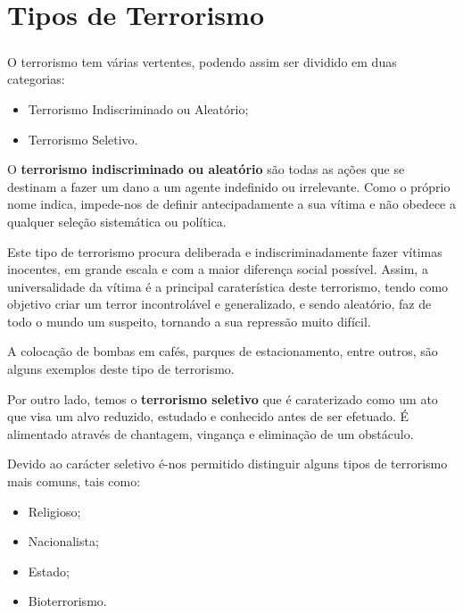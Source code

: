 \documentclass{report}
\begin{document}

\chapter{Tipos de Terrorismo}
\label{chap.Tipos de Terrorismo}

\paragraph{} O terrorismo tem várias vertentes, podendo assim ser dividido em duas categorias:
\begin{itemize}
 \item Terrorismo Indiscriminado ou Aleatório;
 \item Terrorismo Seletivo. 
\end{itemize}

O \textbf{terrorismo indiscriminado ou aleatório} são todas as ações que se destinam a fazer um dano a um agente indefinido ou irrelevante. Como o próprio nome indica, impede-nos de definir antecipadamente a sua vítima e não obedece a qualquer seleção sistemática ou política. \par
Este tipo de terrorismo procura deliberada e indiscriminadamente fazer vítimas inocentes, em grande escala e com a maior diferença social possível. Assim, a universalidade da vítima é a principal caraterística deste terrorismo, tendo como objetivo criar um terror incontrolável e generalizado, e sendo aleatório, faz de todo o mundo um suspeito, tornando a sua repressão muito difícil. \par
A colocação de bombas em cafés, parques de estacionamento, entre outros, são alguns exemplos deste tipo de terrorismo. \par 
Por outro lado, temos o \textbf{terrorismo seletivo} que é caraterizado como um ato que visa um alvo reduzido, estudado e conhecido antes de ser efetuado. É alimentado através de chantagem, vingança e eliminação de um obstáculo. \par
Devido ao carácter seletivo é-nos permitido distinguir alguns tipos de terrorismo mais comuns, tais como:
\begin{itemize}
 \item Religioso;
 \item Nacionalista;
 \item Estado; 
 \item Bioterrorismo.
\end{itemize}
\end{document}
